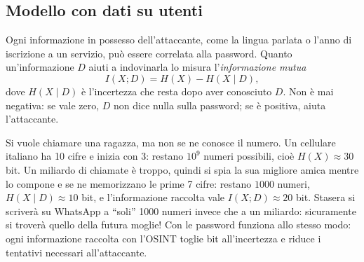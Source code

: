 \subsection{Modello con dati su utenti}
Ogni informazione in possesso dell'attaccante, come la lingua parlata o l'anno di iscrizione a un servizio, può essere correlata alla password.
Quanto un'informazione \(D\) aiuti a indovinarla lo misura l'\emph{informazione mutua}
\[
    I(X;D) = H(X) - H(X \mid D),
\]
dove \(H(X \mid D)\) è l'incertezza che resta dopo aver conosciuto \(D\). Non è mai negativa: se vale zero, \(D\) non dice nulla sulla password; se è positiva, aiuta l'attaccante.

\begin{example}\label{ex:telefono}
    Si vuole chiamare una ragazza, ma non se ne conosce il numero. Un cellulare italiano ha 10 cifre e inizia con 3: restano \(10^9\) numeri possibili, cioè \(H(X) \approx 30\) bit.
    Un miliardo di chiamate è troppo, quindi si spia la sua migliore amica mentre lo compone e se ne memorizzano le prime 7 cifre: restano \(1000\) numeri, \(H(X \mid D) \approx 10\) bit, e l'informazione raccolta vale \(I(X;D) \approx 20\) bit.
    Stasera si scriverà su WhatsApp a ``soli'' 1000 numeri invece che a un miliardo: sicuramente si troverà quello della futura moglie!
    Con le password funziona allo stesso modo: ogni informazione raccolta con l'OSINT toglie bit all'incertezza e riduce i tentativi necessari all'attaccante.
\end{example}
